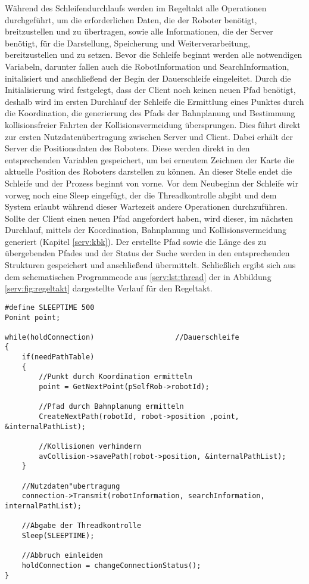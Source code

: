 Während des Schleifendurchlaufs werden im Regeltakt alle Operationen durchgeführt, um die erforderlichen Daten, die der Roboter benötigt, breitzustellen und zu übertragen, sowie alle Informationen, die der Server benötigt, für die Darstellung, Speicherung und Weiterverarbeitung, bereitzustellen und zu setzen. Bevor die Schleife beginnt werden alle notwendigen Variabeln, darunter fallen auch die RobotInformation und SearchInformation, initalisiert und anschließend der Begin der Dauerschleife eingeleitet. Durch die Initialisierung wird festgelegt, dass der Client noch keinen neuen Pfad benötigt, deshalb wird im ersten Durchlauf der Schleife die Ermittlung eines Punktes durch die Koordination, die generierung des Pfads der Bahnplanung und Bestimmung kollisionsfreier Fahrten der Kollisionsvermeidung  übersprungen. Dies führt direkt zur ersten Nutzdatenübertragung zwischen Server und Client. Dabei erhält der Server die Positionsdaten des Roboters. Diese werden direkt in den entsprechenden Variablen gespeichert, um bei erneutem Zeichnen der Karte die aktuelle Position des Roboters darstellen zu können. An dieser Stelle endet die Schleife und der Prozess beginnt von vorne. Vor dem Neubeginn der Schleife wir vorweg noch eine Sleep eingefügt, der die Threadkontrolle abgibt und dem System erlaubt während dieser Wartezeit andere Operationen durchzuführen. Sollte der Client einen neuen Pfad angefordert haben, wird dieser, im nächsten Durchlauf, mittels der Koordination, Bahnplanung und Kollisionsvermeidung generiert (Kapitel \ref{serv:kbk}). Der erstellte Pfad sowie die Länge des zu übergebenden Pfades und der Status der Suche werden in den entsprechenden Strukturen gespeichert und anschließend übermittelt. Schließlich ergibt sich aus dem schematischen Programmcode aus \ref{serv:lst:thread} der in Abbildung \ref{serv:fig:regeltakt} dargestellte Verlauf für den Regeltakt.\\

\begin{lstlisting}[frame=tb,captionpos=b,caption=Thread des Regeltaktes., label=serv:lst:thread]
#define SLEEPTIME 500
Ponint point;

while(holdConnection) 					//Dauerschleife
{	
	if(needPathTable)
	{
		//Punkt durch Koordination ermitteln
		point = GetNextPoint(pSelfRob->robotId);
		
		//Pfad durch Bahnplanung ermitteln
		CreateNextPath(robotId, robot->position ,point, &internalPathList);
		
		//Kollisionen verhindern
		avCollision->savePath(robot->position, &internalPathList);
	} 	
	
	//Nutzdaten"ubertragung
	connection->Transmit(robotInformation, searchInformation, internalPathList);
	
	//Abgabe der Threadkontrolle
	Sleep(SLEEPTIME);
	
	//Abbruch einleiden
	holdConnection = changeConnectionStatus();
}

\end{lstlisting}


